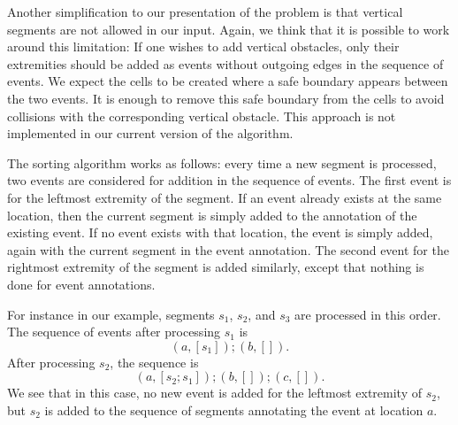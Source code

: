 \documentclass{easychair}
\begin{document}
Another simplification to our presentation of the problem is that
vertical segments are not allowed in our input.  Again, we think that
it is possible to work around this limitation: If one wishes to add
vertical obstacles, only their extremities should be added as events
without outgoing edges in the sequence of events.  We expect the
cells to be created where a safe boundary appears between the two
events.  It is enough to remove this safe boundary from the cells to
avoid collisions with the corresponding vertical obstacle.  This
approach is not implemented in our current version of the algorithm.

The sorting algorithm works as follows: every time a new segment is
processed, two events are considered for addition in the sequence of events.
The first event is for the leftmost extremity of the segment.  If an
event already exists at the same location, then the current segment is
simply added to the annotation of the existing event.  If no event exists
with that location, the event is simply added, again with the current segment
in the event annotation.  The second event for the rightmost extremity of the
segment is added similarly, except that nothing is done for event annotations.

For instance in our example, segments \(s_1\), \(s_2\), and \(s_3\) are
processed in this order.  The sequence of events after processing \(s_1\) is
\[ (a, [s_1]); (b, []).\]
After processing \(s_2\), the sequence is
\[ (a, [s_2; s_1]); (b, []); (c, []). \]
We see that in this case, no new event is added for the leftmost extremity
of \(s_2\), but \(s_2\) is added to the sequence of segments annotating the
event at location \(a\).
\end{document}
